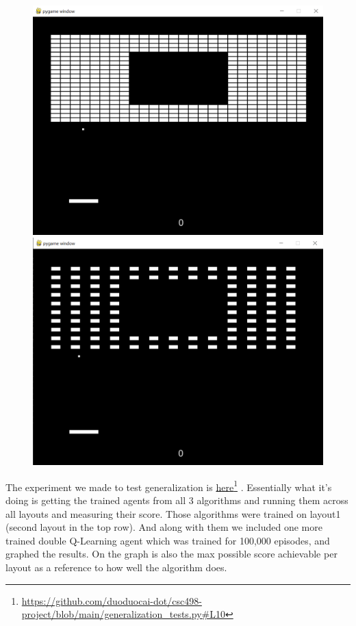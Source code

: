 \documentclass[twoside,11pt]{article}
\newcommand\fnurl[2]{%
  \href{#2}{#1}\footnote{\url{#2}}%
}
\begin{document}
\begin{figure}[H]
\includegraphics[scale=0.2]{layout6}
\includegraphics[scale=0.2]{layout7}
\centering
\end{figure}
The experiment we made to test generalization is \fnurl{here}{https://github.com/duoduocai-dot/csc498-project/blob/main/generalization_tests.py\#L10}. Essentially what it's doing is getting the trained agents from all 3 algorithms and running them across all layouts and measuring their score. Those algorithms were trained on layout1 (second layout in the top row). And along with them we included one more trained double Q-Learning agent which was trained for 100,000 episodes, and graphed the results. On the graph is also the max possible score achievable per layout as a reference to how well the algorithm does.
\end{document}
